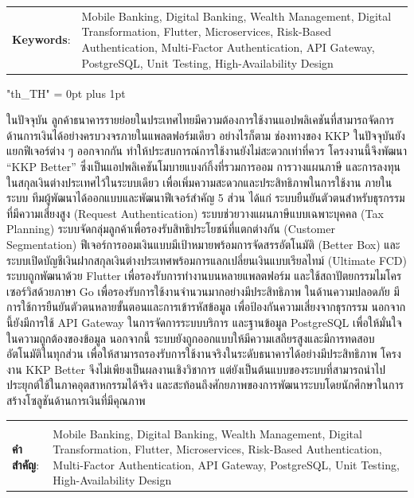 \documentclass[12pt,oneside,openright,a4paper]{cpe-english-project}
\begin{document}
\begin{flushleft}
\begin{tabular*}{\textwidth}{@{}lp{}}
\textbf{Keywords}: & Mobile Banking, Digital Banking, Wealth Management, Digital Transformation, Flutter, Microservices, Risk-Based Authentication, Multi-Factor Authentication, API Gateway, PostgreSQL, Unit Testing, High-Availability Design
\end{tabular*}
\end{flushleft}
\endabstract

{
\XeTeXlinebreaklocale "th_TH"	
\XeTeXlinebreakskip = 0pt plus 1pt
\thaifont
\thaiabstract

ในปัจจุบัน ลูกค้าธนาคารรายย่อยในประเทศไทยมีความต้องการใช้งานแอปพลิเคชันที่สามารถจัดการด้านการเงินได้อย่างครบวงจรภายในแพลตฟอร์มเดียว อย่างไรก็ตาม ช่องทางของ KKP ในปัจจุบันยังแยกฟีเจอร์ต่าง ๆ ออกจากกัน ทำให้ประสบการณ์การใช้งานยังไม่สะดวกเท่าที่ควร โครงงานนี้จึงพัฒนา “KKP Better” ซึ่งเป็นแอปพลิเคชันโมบายแบงก์กิ้งที่รวมการออม การวางแผนภาษี และการลงทุนในสกุลเงินต่างประเทศไว้ในระบบเดียว เพื่อเพิ่มความสะดวกและประสิทธิภาพในการใช้งาน
ภายในระบบ ทีมผู้พัฒนาได้ออกแบบและพัฒนาฟีเจอร์สำคัญ 5 ส่วน ได้แก่ ระบบยืนยันตัวตนสำหรับธุรกรรมที่มีความเสี่ยงสูง (Request Authentication) ระบบช่วยวางแผนภาษีแบบเฉพาะบุคคล (Tax Planning) ระบบจัดกลุ่มลูกค้าเพื่อรองรับสิทธิประโยชน์ที่แตกต่างกัน (Customer Segmentation) ฟีเจอร์การออมเงินแบบมีเป้าหมายพร้อมการจัดสรรอัตโนมัติ (Better Box) และระบบเปิดบัญชีเงินฝากสกุลเงินต่างประเทศพร้อมการแลกเปลี่ยนเงินแบบเรียลไทม์ (Ultimate FCD)
ระบบถูกพัฒนาด้วย Flutter เพื่อรองรับการทำงานบนหลายแพลตฟอร์ม และใช้สถาปัตยกรรมไมโครเซอร์วิสด้วยภาษา Go เพื่อรองรับการใช้งานจำนวนมากอย่างมีประสิทธิภาพ ในด้านความปลอดภัย มีการใช้การยืนยันตัวตนหลายขั้นตอนและการเข้ารหัสข้อมูล เพื่อป้องกันความเสี่ยงจากธุรกรรม นอกจากนี้ยังมีการใช้ API Gateway ในการจัดการระบบบริการ และฐานข้อมูล PostgreSQL เพื่อให้มั่นใจในความถูกต้องของข้อมูล
นอกจากนี้ ระบบยังถูกออกแบบให้มีความเสถียรสูงและมีการทดสอบอัตโนมัติในทุกส่วน เพื่อให้สามารถรองรับการใช้งานจริงในระดับธนาคารได้อย่างมีประสิทธิภาพ โครงงาน KKP Better จึงไม่เพียงเป็นผลงานเชิงวิชาการ แต่ยังเป็นต้นแบบของระบบที่สามารถนำไปประยุกต์ใช้ในภาคอุตสาหกรรมได้จริง และสะท้อนถึงศักยภาพของการพัฒนาระบบโดยนักศึกษาในการสร้างโซลูชันด้านการเงินที่มีคุณภาพ


\begin{flushleft}
\begin{tabular*}{\textwidth}{@{}lp{}}
 & \\

\textbf{คำสำคัญ}: & Mobile Banking, Digital Banking, Wealth Management, Digital Transformation, Flutter, Microservices, Risk-Based Authentication, Multi-Factor Authentication, API Gateway, PostgreSQL, Unit Testing, High-Availability Design
\end{tabular*}
\end{flushleft}
\endabstract
}
\end{document}
